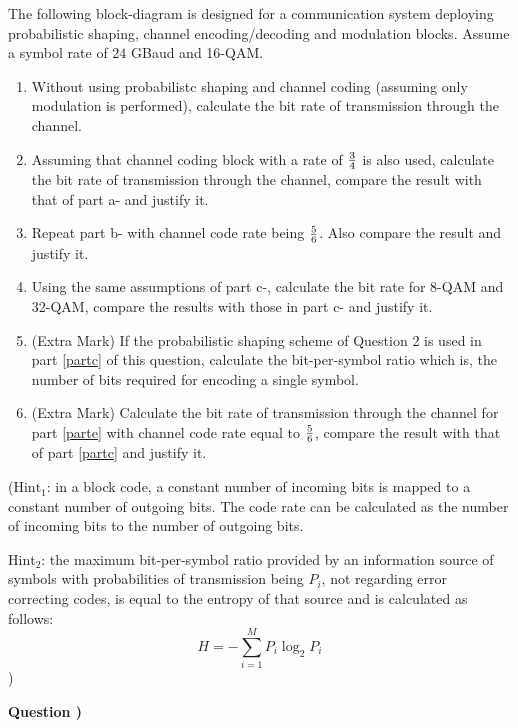 \documentclass[10pt,letterpaper]{article}
\newcounter{QuestionNumber}
\newcommand{\Q}{
\textbf{Question \theQuestionNumber)}
\stepcounter{QuestionNumber}
}
\newcommand{\nl}{\newline\newline}
\begin{document}
The following block-diagram is designed for a communication system deploying probabilistic shaping, channel encoding/decoding and modulation blocks. Assume a symbol rate of $24$ GBaud and 16-QAM.
\begin{enumerate}[label=\alph*-]
\item
Without using probabilistc shaping and channel coding (assuming only modulation is performed), calculate the bit rate of transmission through the channel.
\item
Assuming that channel coding block with a rate of $3\over 4$ is also used, calculate the bit rate of transmission through the channel, compare the result with that of part a- and justify it.
\item
Repeat part b- with channel code rate being $5\over 6$. Also compare the result and justify it.
\label{partc}
\item
Using the same assumptions of part c-, calculate the bit rate for 8-QAM and 32-QAM, compare the results with those in part c- and justify it.
\item (Extra Mark)
\label{parte}
If the probabilistic shaping scheme of Question 2 is used in part \ref{partc} of this question,  calculate the  bit-per-symbol ratio which is, the number of bits required for encoding a single symbol.
\item (Extra Mark)
Calculate the bit rate of transmission through the channel for part \ref{parte} with channel code rate equal to $5\over 6$, compare the result with that of part \ref{partc} and justify it.
\end{enumerate}
($\text{Hint}_1$: in a block code, a constant number of incoming bits is mapped to a constant number of outgoing bits. The code rate can be calculated as the number of incoming bits to the number of outgoing bits.

$\text{Hint}_2$: the maximum bit-per-symbol ratio provided by an information source of symbols with probabilities of transmission being $P_i$, not regarding error correcting codes, is equal to the entropy of that source and is calculated as follows:
$$
H=-\sum_{i=1}^MP_i\log_2 P_i
$$
)\nl
\Q
\end{document}

